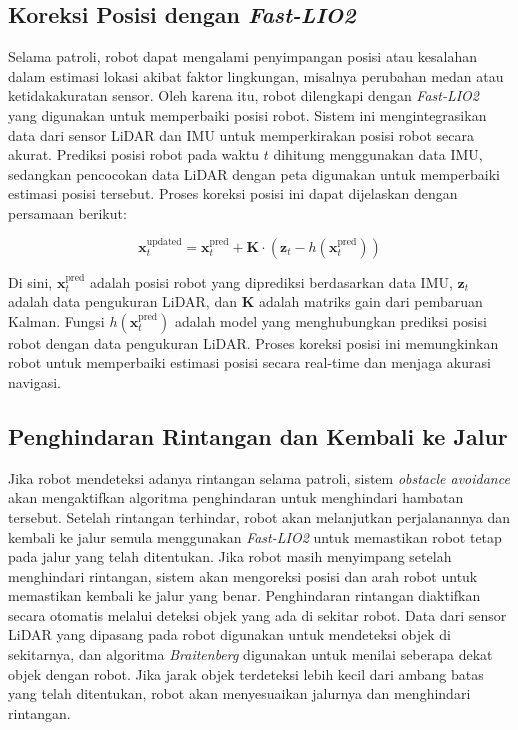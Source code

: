 \subsection{Koreksi Posisi dengan \emph{Fast-LIO2}}
Selama patroli, robot dapat mengalami penyimpangan posisi atau kesalahan dalam estimasi lokasi akibat faktor lingkungan, misalnya perubahan medan atau ketidakakuratan sensor. Oleh karena itu, robot dilengkapi dengan \emph{Fast-LIO2} yang digunakan untuk memperbaiki posisi robot. Sistem ini mengintegrasikan data dari sensor LiDAR dan IMU untuk memperkirakan posisi robot secara akurat. Prediksi posisi robot pada waktu \( t \) dihitung menggunakan data IMU, sedangkan pencocokan data LiDAR dengan peta digunakan untuk memperbaiki estimasi posisi tersebut. Proses koreksi posisi ini dapat dijelaskan dengan persamaan berikut:

\begin{equation}
\mathbf{x}_t^{\text{updated}} = \mathbf{x}_t^{\text{pred}} + \mathbf{K} \cdot (\mathbf{z}_t - h(\mathbf{x}_t^{\text{pred}}))
\end{equation}

Di sini, \( \mathbf{x}_t^{\text{pred}} \) adalah posisi robot yang diprediksi berdasarkan data IMU, \( \mathbf{z}_t \) adalah data pengukuran LiDAR, dan \( \mathbf{K} \) adalah matriks gain dari pembaruan Kalman. Fungsi \( h(\mathbf{x}_t^{\text{pred}}) \) adalah model yang menghubungkan prediksi posisi robot dengan data pengukuran LiDAR. Proses koreksi posisi ini memungkinkan robot untuk memperbaiki estimasi posisi secara real-time dan menjaga akurasi navigasi.

\subsection{Penghindaran Rintangan dan Kembali ke Jalur}
Jika robot mendeteksi adanya rintangan selama patroli, sistem \emph{obstacle avoidance} akan mengaktifkan algoritma penghindaran untuk menghindari hambatan tersebut. Setelah rintangan terhindar, robot akan melanjutkan perjalanannya dan kembali ke jalur semula menggunakan \emph{Fast-LIO2} untuk memastikan robot tetap pada jalur yang telah ditentukan. Jika robot masih menyimpang setelah menghindari rintangan, sistem akan mengoreksi posisi dan arah robot untuk memastikan kembali ke jalur yang benar. Penghindaran rintangan diaktifkan secara otomatis melalui deteksi objek yang ada di sekitar robot. Data dari sensor LiDAR yang dipasang pada robot digunakan untuk mendeteksi objek di sekitarnya, dan algoritma \emph{Braitenberg} digunakan untuk menilai seberapa dekat objek dengan robot. Jika jarak objek terdeteksi lebih kecil dari ambang batas yang telah ditentukan, robot akan menyesuaikan jalurnya dan menghindari rintangan.

